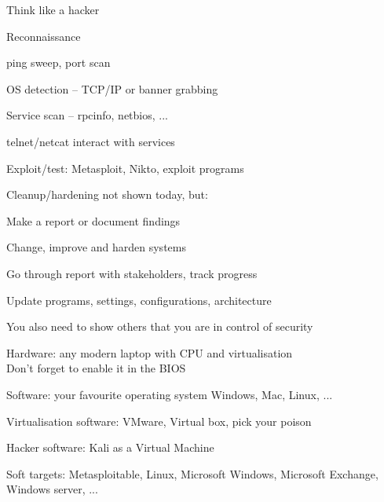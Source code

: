 \documentclass[Screen16to9,17pt]{foils}
\begin{document}



\begin{list1}
\item Think like a hacker
\item Reconnaissance
\begin{list2}
\item ping sweep, port scan
\item OS detection -- TCP/IP or banner grabbing
\item Service scan -- rpcinfo, netbios, ...
\item telnet/netcat interact with services
\end{list2}
\item Exploit/test: Metasploit, Nikto, exploit programs
\item Cleanup/hardening not shown today, but:
\begin{list2}
\item Make a report or document findings
\item Change, improve and harden systems
\item Go through report with stakeholders, track progress
\item Update programs, settings, configurations, architecture
\end{list2}
\item You also need to show others that you are in control of security
\end{list1}




\begin{list2}
\item Hardware: any modern laptop with CPU and virtualisation\\
Don't forget to enable it in the BIOS
\item Software: your favourite operating system Windows, Mac, Linux, ...
\item Virtualisation software: VMware, Virtual box, pick your poison
\item Hacker software: Kali as a Virtual Machine 
\item Soft targets: Metasploitable, Linux, Microsoft Windows, Microsoft Exchange, Windows server, ...
\end{list2}

\end{document}
